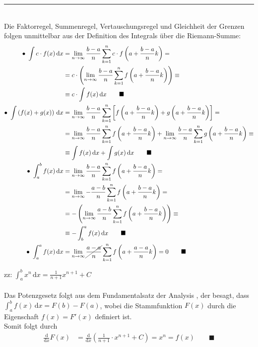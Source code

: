\documentclass{article}
\newcommand{\diff}{\mathrm{d}}
\newcommand{\lr}[1]{\left(#1\right)}
\newcommand{\lreck}[1]{\left[#1\right]}
\begin{document}
{\color{violet}
\hrule
	\\
	Die Faktorregel, Summenregel, Vertauschungsregel und Gleichheit der Grenzen folgen unmittelbar aus der Definition des Integrals über die Riemann-Summe:
		\begin{align*}
			\bullet \ \int c \cdot f(x) \, \diff x &= \lim_{n\to\infty} \frac{b-a}{n} \sum_{k=1}^n c\cdot f\lr{ a + \frac{b-a}{n}k } = \\
			&= c \cdot \lr{ \lim_{n\to\infty} \frac{b-a}{n} \sum_{k=1}^n f\lr{ a + \frac{b-a}{n}k } } \equiv \\
			&\equiv c \cdot \int f(x) \, \diff x \qquad \blacksquare \\
			\bullet \ \int \lr{ f(x) + g(x) } \, \diff x &= \lim_{n\to\infty} \frac{b-a}{n} \sum_{k=1}^n \lreck{ f\lr{ a + \frac{b-a}{n}k } + g\lr{ a + \frac{b-a}{n}k } } = \\
			&= \lim_{n\to\infty} \frac{b-a}{n} \sum_{k=1}^n f\lr{ a + \frac{b-a}{n}k } + \lim_{n\to\infty} \frac{b-a}{n} \sum_{k=1}^n g\lr{ a + \frac{b-a}{n}k } \equiv \\
			&\equiv \int f(x) \, \diff x + \int g(x) \, \diff x \qquad \blacksquare \\
			\bullet \ \int_a^b f(x) \, \diff x &= \lim_{n\to\infty} \frac{b-a}{n} \sum_{k=1}^n f\lr{ a + \frac{b-a}{n}k } = \\
			&=\lim_{n\to\infty} -\frac{a-b}{n} \sum_{k=1}^n f\lr{ a + \frac{b-a}{n}k } = \\
			&= -\lr{ \lim_{n\to\infty} \frac{a-b}{n} \sum_{k=1}^n f\lr{ a + \frac{b-a}{n}k } } \equiv \\
			&\equiv -\int_b^a f(x) \, \diff x \qquad \blacksquare \\
			\bullet \ \int_a^a f(x) \, \diff x &= \lim_{n\to\infty} \cancel{ \frac{a-a}{n} } \sum_{k=1}^n f\lr{ a + \frac{a-a}{n}k } = 0 \qquad \blacksquare
		\end{align*}


	zz: $\int_a^b x^n \, \diff x = \frac{1}{n+1}x^{n+1} + C$\\
\\
	Das Potenzgesetz folgt aus dem Fundamentalsatz der Analysis	, der besagt, dass $\int_a^b f(x) \, \diff x = F(b) - F(a)$, wobei die Stammfunktion $F(x)$ durch die Eigenschaft $f(x) = F'(x)$ definiert ist.\\
	Somit folgt durch
		\begin{align*}
			\frac{\diff}{\diff x} F(x) &= \frac{\diff}{\diff x} \lr{ \frac{1}{n+1} \cdot x^{n+1} + C } = x^n = f(x) \qquad \blacksquare
		\end{align*}

}
\end{document}
